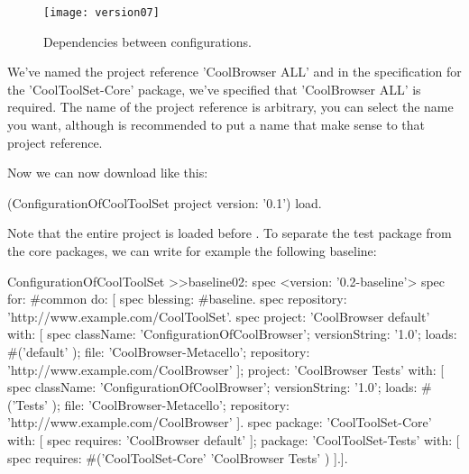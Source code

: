 \documentclass[a4paper,10pt,twoside]{book}
\begin{document}
\begin{figure}
\begin{center}
\texttt{[image: version07]}
\caption{Dependencies between configurations.\label{fig:version07}}
\end{center}
\end{figure} 


We've named the project reference 'CoolBrowser ALL' and in the specification for the 'CoolToolSet-Core' package, we've specified that 'CoolBrowser ALL' is required. The name of the project reference is arbitrary, you can select the name you want, although is recommended to put a name that make sense to that project reference. 

Now we can now download  like this:

\begin{code}{}
(ConfigurationOfCoolToolSet project version: '0.1') load.
\end{code}

Note that the entire  project is loaded before . To separate the test package from the core packages, we can write for example the following baseline:

\begin{code}{}
ConfigurationOfCoolToolSet >>baseline02: spec 
       <version: '0.2-baseline'>
       spec for: #common do: [
              spec blessing: #baseline.
              spec repository: 'http://www.example.com/CoolToolSet'.
              spec
                     project: 'CoolBrowser default' with: [
                            spec
                                   className: 'ConfigurationOfCoolBrowser';
                                   versionString: '1.0';
                                   loads: #('default' );
                                   file: 'CoolBrowser-Metacello';
                                   repository: 'http://www.example.com/CoolBrowser' ];
                     project: 'CoolBrowser Tests' with: [
                            spec
                                   className: 'ConfigurationOfCoolBrowser';
                                   versionString: '1.0';
                                   loads: #('Tests' );
                                   file: 'CoolBrowser-Metacello';
                                   repository: 'http://www.example.com/CoolBrowser' ].
              spec 
                     package: 'CoolToolSet-Core' with: [ spec requires: 'CoolBrowser default' ];
                     package: 'CoolToolSet-Tests' with: [ 
                            spec requires: #('CoolToolSet-Core'  'CoolBrowser Tests'  ) ].].                     
\end{code}
\end{document}
